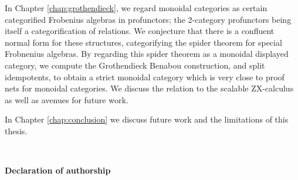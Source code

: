 \documentclass[12pt]{ociamthesis}  %
\begin{document}
In Chapter \ref{chap:grothendieck}, we regard monoidal categories as certain categorified Frobenius algebras in profunctors; the 2-category profunctors being itself a categorification of relations.  We conjecture that there is a confluent normal form for these structures, categorifying the spider theorem for special Frobnenius algebras.  By regarding this spider theorem as a monoidal displayed category, we compute the Grothendieck Benabou construction, and split idempotents, to obtain a strict monoidal category which is very close to proof nets for monoidal categories. We discuss the relation to the scalable ZX-calculus as well as avenues for future work.

In Chapter \ref{chap:conclusion} we discuss future work and the limitations of this thesis.


%
%
%
%

\

{\bf \large  Declaration of authorship}
\end{document}
